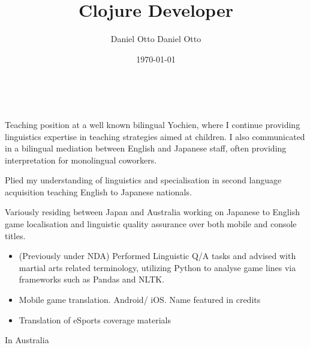 \documentclass[10pt,a4paper,ragged2e,withhyper]{altacv}
\author{Daniel Otto Daniel Otto}
\date{\today}
\title{Clojure Developer}
\begin{document}

\makecvheader

​\begin{paracol}{2}

\label{sec:org97213fd}
Teaching position at a well known bilingual Yochien, where I continue providing linguistics expertise in teaching strategies aimed at children. I also communicated in a bilingual mediation between English and Japanese staff, often providing interpretation for monolingual coworkers.
\par\divider
{}
Plied my understanding of linguistics and specialisation in second language acquisition teaching English to Japanese nationals.
\par\divider
{}
Variously residing between Japan and Australia working on Japanese to English game localisation and linguistic quality assurance over both mobile and console titles.

\label{sec:org27e21f4}
\begin{itemize}
\item (Previously under NDA) Performed Linguistic Q/A tasks and advised with martial arts related terminology, utilizing Python to analyse game lines via frameworks such as Pandas and NLTK.
\end{itemize}
\begin{itemize}
\item Mobile game translation. Android/ iOS. Name featured in credits
\end{itemize}
\begin{itemize}
\item Translation of eSports coverage materials
\end{itemize}
\label{sec:org871587d}
In Australia
\switchcolumn


\end{paracol}
\end{document}

